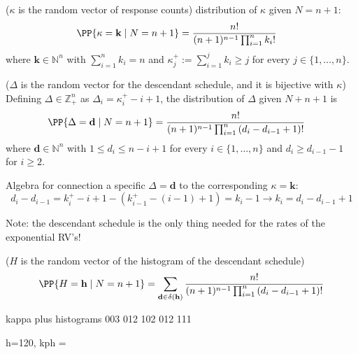 \section{}


($\kappa$ is the random vector of response counts) distribution of $\kappa$ given $N=n+1$:
\begin{align}
\PP{\kappa = \mathbf{k} \mid N = n+1}
&=
\frac{n!}{(n+1)^{n-1}\prod_{i=1}^n k_i !}
\end{align}
where $\mathbf{k} \in \mathbb{N}^n$ with $\sum_{i=1}^n k_i = n$ and $\kappa_j^+ := \sum_{i=1}^j k_i \geq j$ for every $j \in \{1, \dots, n\}$.

($\Delta$ is the random vector for the descendant schedule, and it is bijective with $\kappa$) Defining $\Delta \in \mathbb{Z}_+^n$ as $\Delta_i = \kappa_i^+ - i + 1$, the distribution of $\Delta$ given $N+n+1$ is
\begin{align}
\PP{\Delta = \mathbf{d} \mid N = n+1}
&=
\frac{n!}{(n+1)^{n-1}\prod_{i=1}^n \left(d_{i} - d_{i-1} + 1\right) !}
\end{align}
where $\mathbf{d} \in \mathbb{N}^n$ with $1 \leq d_i \leq n - i + 1$ for every $i \in \{1, \dots, n\}$ and $d_i \geq d_{i-1} - 1$ for $i \geq 2$.

Algebra for connection a specific $\Delta = \mathbf{d}$ to the corresponding $\kappa = \mathbf{k}$:
$$
d_{i} - d_{i-1} = k_i^+ - i + 1 - (k_{i-1}^+ - (i - 1) + 1) = k_i - 1 \longrightarrow k_i = d_{i} - d_{i-1} + 1
$$

Note: the descendant schedule is the only thing needed for the rates of the exponential RV's!

($H$ is the random vector of the histogram of the descendant schedule)
\begin{align}
\PP{H = \mathbf{h} \mid N = n+1}
=
\sum_{\mathbf{d} \in \delta(\mathbf{h})}
\frac{n!}{(n+1)^{n-1}\prod_{i=1}^n \left(d_{i} - d_{i-1} + 1\right) !}
\end{align}

kappa plus histograms 
003
012
102
012
111

h=120, kph = 


\newpage




\newpage

\begin{center}
\begin{large}
\end{large}
\end{center}

